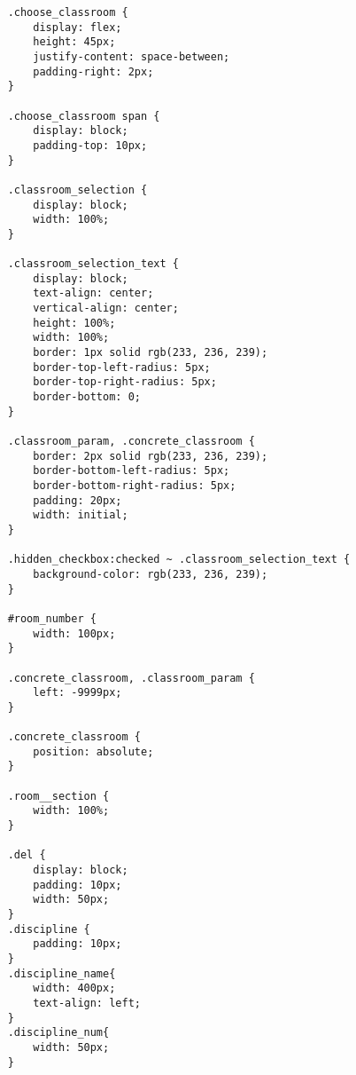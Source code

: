 \begin{lstlisting}
	.choose_classroom {
		display: flex;
		height: 45px;
		justify-content: space-between;
		padding-right: 2px;
	}
	
	.choose_classroom span {
		display: block;
		padding-top: 10px;
	}
	
	.classroom_selection {
		display: block;
		width: 100%;
	}
	
	.classroom_selection_text {
		display: block;
		text-align: center;
		vertical-align: center;
		height: 100%;
		width: 100%;
		border: 1px solid rgb(233, 236, 239);
		border-top-left-radius: 5px;
		border-top-right-radius: 5px;
		border-bottom: 0;
	}
	
	.classroom_param, .concrete_classroom {
		border: 2px solid rgb(233, 236, 239);
		border-bottom-left-radius: 5px;
		border-bottom-right-radius: 5px;
		padding: 20px;
		width: initial;
	}
	
	.hidden_checkbox:checked ~ .classroom_selection_text {
		background-color: rgb(233, 236, 239);
	}
	
	#room_number {
		width: 100px;
	}
	
	.concrete_classroom, .classroom_param {
		left: -9999px;
	}
	
	.concrete_classroom {
		position: absolute;
	}
	
	.room__section {
		width: 100%;
	}
	
	.del {
		display: block;
		padding: 10px;
		width: 50px;
	}
	.discipline {
		padding: 10px;
	}
	.discipline_name{
		width: 400px;
		text-align: left;
	}
	.discipline_num{
		width: 50px;
	}
	
\end{lstlisting}